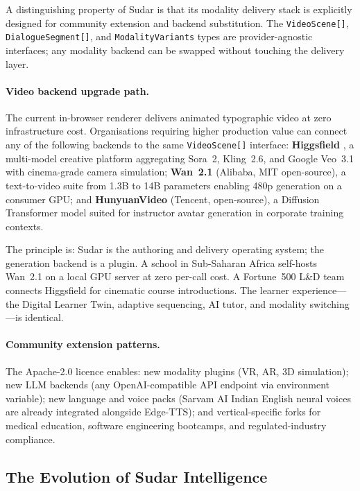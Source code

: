 \documentclass[10pt,twocolumn]{article}
\begin{document}
A distinguishing property of Sudar is that its modality delivery stack
is explicitly designed for community extension and backend substitution.
The \texttt{VideoScene[]}, \texttt{DialogueSegment[]}, and
\texttt{ModalityVariants} types are provider-agnostic interfaces; any
modality backend can be swapped without touching the delivery layer.

\paragraph{Video backend upgrade path.}
The current in-browser renderer delivers animated typographic video at
zero infrastructure cost. Organisations requiring higher production
value can connect any of the following backends to the same
\texttt{VideoScene[]} interface: \textbf{Higgsfield}
\cite{higgsfield2026}, a multi-model creative platform aggregating
Sora~2, Kling~2.6, and Google Veo~3.1 with cinema-grade camera
simulation; \textbf{Wan~2.1} \cite{wan2025} (Alibaba, MIT
open-source), a text-to-video suite from 1.3B to 14B parameters
enabling 480p generation on a consumer GPU; and
\textbf{HunyuanVideo} \cite{hunyuan2025} (Tencent, open-source), a
Diffusion Transformer model suited for instructor avatar generation in
corporate training contexts.

The principle is: Sudar is the authoring and delivery operating system;
the generation backend is a plugin. A school in Sub-Saharan Africa
self-hosts Wan~2.1 on a local GPU server at zero per-call cost. A
Fortune~500 L\&D team connects Higgsfield for cinematic course
introductions. The learner experience---the Digital Learner Twin,
adaptive sequencing, AI tutor, and modality switching---is identical.

\paragraph{Community extension patterns.}
The Apache-2.0 licence enables: new modality plugins (VR, AR, 3D simulation);
new LLM backends (any OpenAI-compatible API endpoint via environment
variable); new language and voice packs (Sarvam AI Indian English
neural voices are already integrated alongside Edge-TTS); and
vertical-specific forks for medical education, software engineering
bootcamps, and regulated-industry compliance.

\subsection{The Evolution of Sudar Intelligence}
\label{sec:intelligence}
\end{document}
